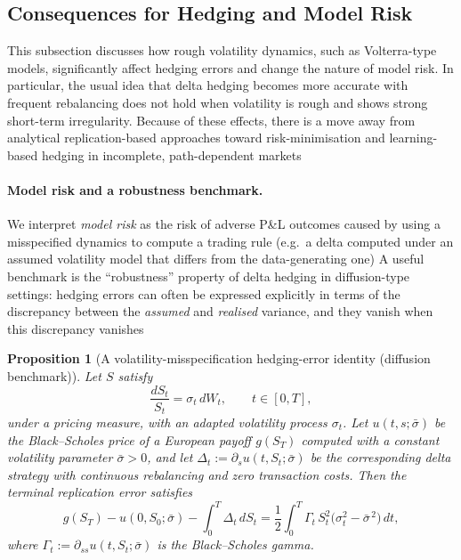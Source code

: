 \documentclass[12pt,a4paper]{article}
\theoremstyle{definition}
\theoremstyle{plain}
\newtheorem{proposition}{Proposition}[section]
\theoremstyle{remark}
\theoremstyle{plain}
\begin{document}
\subsection{Consequences for Hedging and Model Risk}
\label{subsec:consequences_hedging_model_risk}

This subsection discusses how rough volatility dynamics, such as Volterra-type models, significantly affect hedging errors and change the nature of model risk.
In particular, the usual idea that delta hedging becomes more accurate with frequent rebalancing does not hold when volatility is rough and shows strong short-term irregularity.
Because of these effects, there is a move away from analytical replication-based approaches toward risk-minimisation and learning-based hedging in incomplete, path-dependent markets \cite{BlackScholes1973,Heston1993,GatheralRough,BayerFriz2016,FoellmerSchied2016,Horvath2021DeepRough}

\paragraph{Model risk and a robustness benchmark.}
We interpret \emph{model risk} as the risk of adverse P\&L outcomes caused by using a misspecified dynamics to compute a trading rule (e.g.\ a delta computed under an assumed volatility model that differs from the data-generating one) \cite{ElKaroui1998Robustness,FoellmerSchied2016}
A useful benchmark is the ``robustness'' property of delta hedging in diffusion-type settings: hedging errors can often be expressed explicitly in terms of the discrepancy between the \emph{assumed} and \emph{realised} variance, and they vanish when this discrepancy vanishes \cite{ElKaroui1998Robustness,BlackScholes1973}

\begin{proposition}[A volatility-misspecification hedging-error identity (diffusion benchmark)]
\label{prop:delta_hedge_error_identity}
Let $S$ satisfy
\[
\frac{dS_t}{S_t} = \sigma_t\,dW_t, \qquad t\in[0,T],
\]
under a pricing measure, with an adapted volatility process $\sigma_t$.
Let $u(t,s;\bar\sigma)$ be the Black--Scholes price of a European payoff $g(S_T)$ computed with a \emph{constant} volatility parameter $\bar\sigma>0$, and let $\Delta_t := \partial_s u(t,S_t;\bar\sigma)$ be the corresponding delta strategy with continuous rebalancing and zero transaction costs.
Then the terminal replication error satisfies
\[
g(S_T) - u(0,S_0;\bar\sigma) - \int_0^T \Delta_t\,dS_t
=
\frac{1}{2}\int_0^T \Gamma_t\,S_t^2\bigl(\sigma_t^2-\bar\sigma^{\,2}\bigr)\,dt,
\]
where $\Gamma_t := \partial_{ss}u(t,S_t;\bar\sigma)$ is the Black--Scholes gamma.
\end{proposition}
\end{document}
